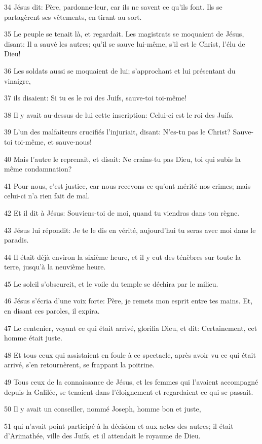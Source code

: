 \par 34 Jésus dit: Père, pardonne-leur, car ils ne savent ce qu'ils font. Ils se partagèrent ses vêtements, en tirant au sort.
\par 35 Le peuple se tenait là, et regardait. Les magistrats se moquaient de Jésus, disant: Il a sauvé les autres; qu'il se sauve lui-même, s'il est le Christ, l'élu de Dieu!
\par 36 Les soldats aussi se moquaient de lui; s'approchant et lui présentant du vinaigre,
\par 37 ils disaient: Si tu es le roi des Juifs, sauve-toi toi-même!
\par 38 Il y avait au-dessus de lui cette inscription: Celui-ci est le roi des Juifs.
\par 39 L'un des malfaiteurs crucifiés l'injuriait, disant: N'es-tu pas le Christ? Sauve-toi toi-même, et sauve-nous!
\par 40 Mais l'autre le reprenait, et disait: Ne crains-tu pas Dieu, toi qui subis la même condamnation?
\par 41 Pour nous, c'est justice, car nous recevons ce qu'ont mérité nos crimes; mais celui-ci n'a rien fait de mal.
\par 42 Et il dit à Jésus: Souviens-toi de moi, quand tu viendras dans ton règne.
\par 43 Jésus lui répondit: Je te le dis en vérité, aujourd'hui tu seras avec moi dans le paradis.
\par 44 Il était déjà environ la sixième heure, et il y eut des ténèbres sur toute la terre, jusqu'à la neuvième heure.
\par 45 Le soleil s'obscurcit, et le voile du temple se déchira par le milieu.
\par 46 Jésus s'écria d'une voix forte: Père, je remets mon esprit entre tes mains. Et, en disant ces paroles, il expira.
\par 47 Le centenier, voyant ce qui était arrivé, glorifia Dieu, et dit: Certainement, cet homme était juste.
\par 48 Et tous ceux qui assistaient en foule à ce spectacle, après avoir vu ce qui était arrivé, s'en retournèrent, se frappant la poitrine.
\par 49 Tous ceux de la connaissance de Jésus, et les femmes qui l'avaient accompagné depuis la Galilée, se tenaient dans l'éloignement et regardaient ce qui se passait.
\par 50 Il y avait un conseiller, nommé Joseph, homme bon et juste,
\par 51 qui n'avait point participé à la décision et aux actes des autres; il était d'Arimathée, ville des Juifs, et il attendait le royaume de Dieu.
